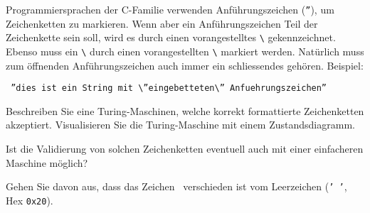 Programmiersprachen der C-Familie verwenden Anführungszeichen
({\tt\textquotedblright}), um Zeichenketten zu markieren.
Wenn aber ein Anführungszeichen Teil der
Zeichenkette sein soll, wird es durch einen vorangestelltes {\tt\textbackslash}
gekennzeichnet.
Ebenso muss ein {\tt\textbackslash} durch einen vorangestellten {\tt\textbackslash}
markiert werden. Natürlich muss zum öffnenden Anführungszeichen
auch immer ein schliessendes gehören. Beispiel:
\begin{center}
\tt
\textquotedblright dies ist ein String mit \textbackslash\textquotedblright eingebetteten\textbackslash\textquotedblright\ Anfuehrungszeichen\textquotedblright
\end{center}
\begin{teilaufgaben}
\item
Beschreiben Sie eine Turing-Maschinen, welche korrekt formattierte
Zeichenketten akzeptiert. Visualisieren Sie die Turing-Maschine mit
einem Zustandsdiagramm.
\item
Ist die Validierung von solchen Zeichenketten eventuell auch mit einer
einfacheren Maschine möglich?
\end{teilaufgaben}


\begin{hinweis}
Gehen Sie davon aus, dass das Zeichen \blank\ verschieden ist
vom Leerzeichen ({\tt ' '}, Hex {\tt 0x20}).
\end{hinweis}

